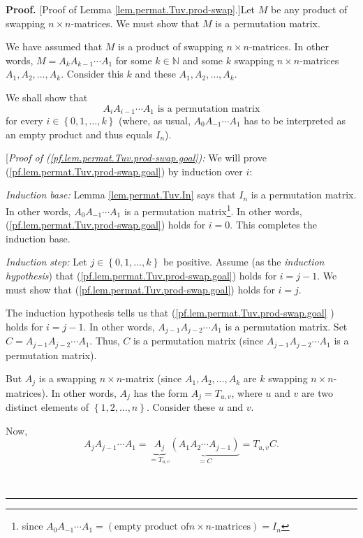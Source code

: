 \documentclass[numbers=enddot,12pt,final,onecolumn,notitlepage]{scrartcl}%
\theoremstyle{definition}
\newenvironment{proof}[1][Proof]{\noindent\textbf{#1.} }{\ \rule{0.5em}{0.5em}}
\begin{document}
\begin{proof}
[Proof of Lemma \ref{lem.permat.Tuv.prod-swap}.]Let $M$ be any product of
swapping $n\times n$-matrices. We must show that $M$ is a permutation matrix.

We have assumed that $M$ is a product of swapping $n\times n$-matrices. In
other words, $M=A_{k}A_{k-1}\cdots A_{1}$ for some $k\in\mathbb{N}$ and some
$k$ swapping $n\times n$-matrices $A_{1},A_{2},\ldots,A_{k}$. Consider this
$k$ and these $A_{1},A_{2},\ldots,A_{k}$.

We shall show that%
\begin{equation}
A_{i}A_{i-1}\cdots A_{1}\text{ is a permutation matrix}
\label{pf.lem.permat.Tuv.prod-swap.goal}%
\end{equation}
for every $i\in\left\{  0,1,\ldots,k\right\}  $ (where, as usual, $A_{0}%
A_{-1}\cdots A_{1}$ has to be interpreted as an empty product and thus equals
$I_{n}$).

[\textit{Proof of (\ref{pf.lem.permat.Tuv.prod-swap.goal}):} We will prove
(\ref{pf.lem.permat.Tuv.prod-swap.goal}) by induction over $i$:

\textit{Induction base:} Lemma \ref{lem.permat.Tuv.In} says that $I_{n}$ is a
permutation matrix. In other words, $A_{0}A_{-1}\cdots A_{1}$ is a permutation
matrix\footnote{since $A_{0}A_{-1}\cdots A_{1}=\left(  \text{empty product of
}n\times n\text{-matrices}\right)  =I_{n}$}. In other words,
(\ref{pf.lem.permat.Tuv.prod-swap.goal}) holds for $i=0$. This completes the
induction base.

\textit{Induction step:} Let $j\in\left\{  0,1,\ldots,k\right\}  $ be
positive. Assume (as the \textit{induction hypothesis}) that
(\ref{pf.lem.permat.Tuv.prod-swap.goal}) holds for $i=j-1$. We must show that
(\ref{pf.lem.permat.Tuv.prod-swap.goal}) holds for $i=j$.

The induction hypothesis tells us that (\ref{pf.lem.permat.Tuv.prod-swap.goal}%
) holds for $i=j-1$. In other words, $A_{j-1}A_{j-2}\cdots A_{1}$ is a
permutation matrix. Set $C=A_{j-1}A_{j-2}\cdots A_{1}$. Thus, $C$ is a
permutation matrix (since $A_{j-1}A_{j-2}\cdots A_{1}$ is a permutation matrix).

But $A_{j}$ is a swapping $n\times n$-matrix (since $A_{1},A_{2},\ldots,A_{k}$
are $k$ swapping $n\times n$-matrices). In other words, $A_{j}$ has the form
$A_{j}=T_{u,v}$, where $u$ and $v$ are two distinct elements of $\left\{
1,2,\ldots,n\right\}  $. Consider these $u$ and $v$.

Now,%
\begin{equation}
A_{j}A_{j-1}\cdots A_{1}=\underbrace{A_{j}}_{=T_{u,v}}\underbrace{\left(
A_{1}A_{2}\cdots A_{j-1}\right)  }_{=C}=T_{u,v}C.
\label{pf.lem.permat.Tuv.prod-swap.goal.pf.1}%
\end{equation}



\end{proof}
\end{document}
